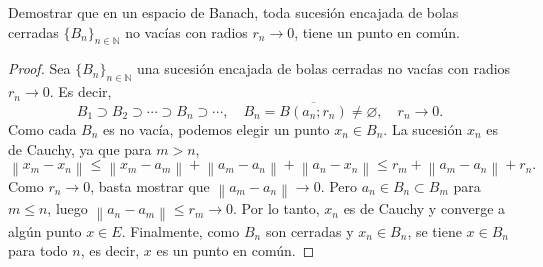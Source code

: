 \documentclass{article}
\theoremstyle{definition}
\newcommand{\N}{\mathbb{N}}
\newcommand{\norm}[1]{\left\lVert #1 \right\rVert}       %
\newcommand{\cl}[1]{\overline{#1}}                        %
\newcommand{\bola}[2]{B(#1;#2)}                           %
\newenvironment{ejercicio}[1]{\begin{trivlist}
\item[\hskip \labelsep {\bfseries Ejercicio}\hskip \labelsep {\bfseries #1.}]}{\end{trivlist}}
\begin{document}
\begin{ejercicio}{10}
    Demostrar que en un espacio de Banach, toda sucesión encajada de bolas cerradas \({\{B_n\}}_{n\in\N}\) no vacías con radios \(r_n\to 0\), tiene un punto en común.
\end{ejercicio}
\begin{proof}
    Sea \({\{B_n\}}_{n\in\N}\) una sucesión encajada de bolas cerradas no vacías con radios \(r_n\to 0\). Es decir,
    \[
        B_1 \supset B_2 \supset \cdots \supset B_n \supset \cdots, \quad B_n = \cl{\bola{a_n}{r_n}} \neq \varnothing, \quad r_n \to 0.
    \]
    Como cada \(B_n\) es no vacía, podemos elegir un punto \(x_n \in B_n\). La sucesión \({x_n}\) es de Cauchy, ya que para \(m > n\),
    \[
        \norm{x_m - x_n} \leq \norm{x_m - a_m} + \norm{a_m - a_n} + \norm{a_n - x_n} \leq r_m + \norm{a_m - a_n} + r_n.
    \]
    Como \(r_n \to 0\), basta mostrar que \(\norm{a_m - a_n} \to 0\). Pero \(a_n \in B_n \subset B_m\) para \(m \leq n\), luego \(\norm{a_n - a_m} \leq r_m \to 0\). Por lo tanto, \({x_n}\) es de Cauchy y converge a algún punto \(x \in E\). Finalmente, como \(B_n\) son cerradas y \({x_n} \in B_n\), se tiene \(x \in B_n\) para todo \(n\), es decir, \(x\) es un punto en común.
\end{proof}

\vspace{0.5cm}
\end{document}
